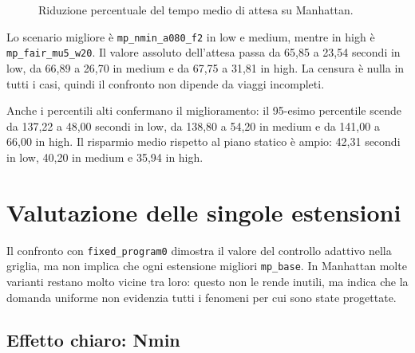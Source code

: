 \documentclass[12pt,a4paper,oneside]{report}
\numberwithin{equation}{chapter}
\begin{document}
\begin{figure}[htbp]
    \centering
    \caption{Riduzione percentuale del tempo medio di attesa su Manhattan.}
    \label{fig:manhattan-reduction}
\end{figure}

Lo scenario migliore è \texttt{mp\_nmin\_a080\_f2} in low e medium, mentre in
high è \texttt{mp\_fair\_mu5\_w20}. Il valore assoluto dell'attesa passa da
65,85 a 23,54 secondi in low, da 66,89 a 26,70 in medium e da 67,75 a 31,81 in
high. La censura è nulla in tutti i casi, quindi il confronto non dipende da
viaggi incompleti.

Anche i percentili alti confermano il miglioramento: il 95-esimo percentile
scende da 137,22 a 48,00 secondi in low, da 138,80 a 54,20 in medium e da
141,00 a 66,00 in high. Il risparmio medio rispetto al piano statico è ampio:
42,31 secondi in low, 40,20 in medium e 35,94 in high.

\section{Valutazione delle singole estensioni}

Il confronto con \texttt{fixed\_program0} dimostra il valore del controllo
adattivo nella griglia, ma non implica che ogni estensione migliori
\texttt{mp\_base}. In Manhattan molte varianti restano molto vicine tra loro:
questo non le rende inutili, ma indica che la domanda uniforme non evidenzia
tutti i fenomeni per cui sono state progettate.

\subsection{Effetto chiaro: Nmin}
\end{document}
